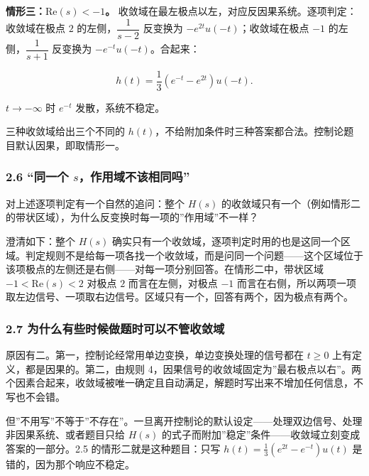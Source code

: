 \documentclass[12pt]{ctexart}
\begin{document}
\textbf{情形三：\(\mathrm{Re}(s)<-1\)。}
收敛域在最左极点以左，对应反因果系统。逐项判定：收敛域在极点 \(2\)
的左侧，\(\dfrac{1}{s-2}\) 反变换为 \(-e^{2t}u(-t)\)；收敛域在极点
\(-1\) 的左侧，\(\dfrac{1}{s+1}\) 反变换为 \(-e^{-t}u(-t)\)。合起来：

\[
h(t)=\frac{1}{3}\left(e^{-t}-e^{2t}\right)u(-t).
\]

\(t\to-\infty\) 时 \(e^{-t}\) 发散，系统不稳定。

三种收敛域给出三个不同的
\(h(t)\)，不给附加条件时三种答案都合法。控制论题目默认因果，即取情形一。

\hypertarget{ux540cux4e00ux4e2a-sux4f5cux7528ux57dfux4e0dux8be5ux76f8ux540cux5417}{%
\subsubsection{\texorpdfstring{2.6 ``同一个
\(s\)，作用域不该相同吗''}{2.6 ``同一个 s，作用域不该相同吗''}}\label{ux540cux4e00ux4e2a-sux4f5cux7528ux57dfux4e0dux8be5ux76f8ux540cux5417}}

对上述逐项判定有一个自然的追问：整个 \(H(s)\)
的收敛域只有一个（例如情形二的带状区域），为什么反变换时每一项的''作用域''不一样？

澄清如下：整个 \(H(s)\)
确实只有一个收敛域，逐项判定时用的也是这同一个区域。判定规则不是给每一项各找一个收敛域，而是问同一个问题------这个区域位于该项极点的左侧还是右侧------对每一项分别回答。在情形二中，带状区域
\(-1<\mathrm{Re}(s)<2\) 对极点 \(2\) 而言在左侧，对极点 \(-1\)
而言在右侧，所以两项一项取左边信号、一项取右边信号。区域只有一个，回答有两个，因为极点有两个。

\hypertarget{ux4e3aux4ec0ux4e48ux6709ux4e9bux65f6ux5019ux505aux9898ux65f6ux53efux4ee5ux4e0dux7ba1ux6536ux655bux57df}{%
\subsubsection{2.7
为什么有些时候做题时可以不管收敛域}\label{ux4e3aux4ec0ux4e48ux6709ux4e9bux65f6ux5019ux505aux9898ux65f6ux53efux4ee5ux4e0dux7ba1ux6536ux655bux57df}}

原因有二。第一，控制论经常用单边变换，单边变换处理的信号都在 \(t\ge 0\)
上有定义，都是因果的。第二，由规则
4，因果信号的收敛域固定为''最右极点以右''。两个因素合起来，收敛域被唯一确定且自动满足，解题时写出来不增加任何信息，不写也不会错。

但''不用写''不等于''不存在''。一旦离开控制论的默认设定------处理双边信号、处理非因果系统、或者题目只给
\(H(s)\) 的式子而附加''稳定''条件------收敛域立刻变成答案的一部分。2.5
的情形二就是这种题目：只写 \(h(t)=\frac{1}{3}(e^{2t}-e^{-t})u(t)\)
是错的，因为那个响应不稳定。
\end{document}
